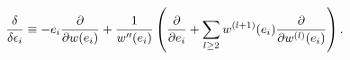 \begin{equation}
\frac{\delta }{\delta \epsilon _{i}}\equiv -e_{i}\frac{\partial }{\partial
w(e_{i})}+\frac{1}{w^{\prime \prime }(e_{i})}\left( \frac{\partial }{%
\partial e_{i}}+\sum_{l\geq 2}w^{(l+1)}(e_{i})\frac{\partial }{\partial
w^{(l)}(e_{i})}\right) .
\end{equation}

